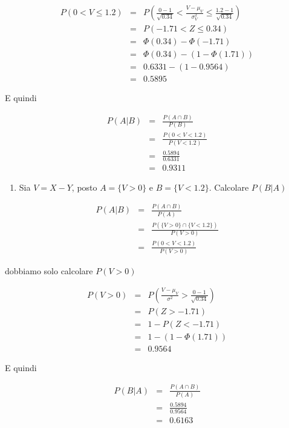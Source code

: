 \documentclass[
  11pt,
]{book}
\providecommand{\tightlist}{%
  \setlength{\itemsep}{0pt}\setlength{\parskip}{0pt}}
\theoremstyle{mytheoremstyle}
\theoremstyle{mydefstyle}
\begin{document}
\begin{eqnarray*}
   P( 0 < V \leq  1.2 ) &=& P\left( \frac { 0  -  1 }{\sqrt{ 0.34 }} < \frac { V  -  \mu_V }{ \sigma^2_V } \leq \frac { 1.2  -  1 }{\sqrt{ 0.34 }}\right)  \\
              &=& P\left(  -1.71  < Z \leq  0.34 \right) \\
              &=& \Phi( 0.34 )-\Phi( -1.71 )\\
              &=&  \Phi( 0.34 )-(1-\Phi( 1.71 )) \\ &=&  0.6331 -(1- 0.9564 ) \\ 
              &=&  0.5895 
   \end{eqnarray*}

E quindi

\begin{eqnarray*}
   P(A|B)&=&\frac{P(A\cap B)}{P(B)}\\
   &=&\frac{P(0<V<1.2)}{P(V<1.2)}\\
   &=&\frac{0.5894}{0.6331}\\
   &=&0.9311
\end{eqnarray*}

\begin{enumerate}
\def\labelenumi{\arabic{enumi}.}
\setcounter{enumi}{13}
\tightlist
\item
  Sia \(V=X-Y\), posto \(A=\{V>0\}\) e \(B=\{V<1.2\}\). Calcolare \(P(B|A)\)
\end{enumerate}

\begin{eqnarray*}
   P(A|B)&=&\frac{P(A\cap B)}{P(A)}\\
   &=&\frac{P(\{V>0\}\cap \{V<1.2\})}{P(V>0)}\\
   &=&\frac{P(0<V<1.2)}{P(V>0)}
\end{eqnarray*}

dobbiamo solo calcolare \(P(V>0)\)

\begin{eqnarray*}
      P( V   >   0 ) 
        &=& P\left(  \frac { V  -  \mu_V }{ \sigma^2 }  >  \frac { 0  -  1 }{\sqrt{ 0.34 }} \right)  \\
                 &=& P\left(  Z   >   -1.71 \right) \\    &=& 1-P(Z< -1.71 )\\ 
                 &=&  1-(1-\Phi( 1.71 )) \\ &=&  0.9564 
      \end{eqnarray*}

E quindi

\begin{eqnarray*}
   P(B|A)&=&\frac{P(A\cap B)}{P(A)}\\
   &=&\frac{0.5894}{0.9564}\\
   &=&0.6163
\end{eqnarray*}
\end{document}
